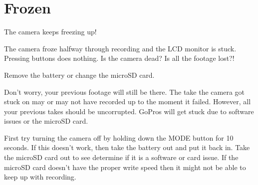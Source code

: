 \chapter{Frozen}
\pagecolor{white}
\label{chap:18}
\begin{fullwidth}


\problem

{\large The camera keeps freezing up!


 \par}

The camera froze halfway through recording and the LCD monitor is stuck. Pressing buttons does nothing. Is the camera dead? Is all the footage lost?! 


\solution

{\large Remove the battery or change the microSD card.



 \par}

Don’t worry, your previous footage will still be there. The take the camera got stuck on may or may not have recorded up to the moment it failed. However, all your previous takes should be uncorrupted. GoPros will get stuck due to software issues or the microSD card. 

First try turning the camera off by holding down the MODE button for 10 seconds. 
If this doesn’t work, then take the battery out and put it back in. Take the microSD card out to see determine if it is a software or card issue. If the microSD card doesn't have the proper write speed then it might not be able to keep up with recording. 






\clearpage
\end{fullwidth}
